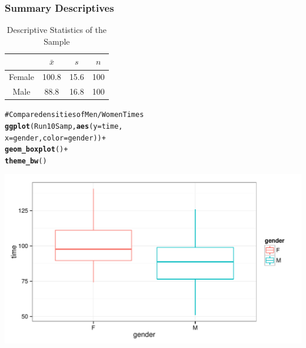 \documentclass{beamer}\usepackage{graphicx, color}
\makeatletter
\def\maxwidth{ %
  \ifdim\Gin@nat@width>\linewidth
    \linewidth
  \else
    \Gin@nat@width
  \fi
}
\newcommand{\hlfunctioncall}[1]{\textcolor[rgb]{0.501960784313725,0,0.329411764705882}{\textbf{#1}}}%
\newcommand{\hlcomment}[1]{\textcolor[rgb]{0.180392156862745,0.6,0.341176470588235}{#1}}%
\newenvironment{kframe}{%
 \def\at@end@of@kframe{}%
 \ifinner\ifhmode%
  \def\at@end@of@kframe{\end{minipage}}%
  \begin{minipage}{\columnwidth}%
 \fi\fi%
 \def\FrameCommand##1{\hskip\@totalleftmargin \hskip-\fboxsep
 \colorbox{shadecolor}{##1}\hskip-\fboxsep
     \hskip-\linewidth \hskip-\@totalleftmargin \hskip\columnwidth}%
 \MakeFramed {\advance\hsize-\width
   \@totalleftmargin\z@ \linewidth\hsize
   \@setminipage}}%
 {\par\unskip\endMakeFramed%
 \at@end@of@kframe}
\newenvironment{knitrout}{}{} %
\makeatother
\begin{document}
\begin{frame}[fragile]
  \frametitle{Summary Descriptives}


  
  \begin{table}
  \caption{Descriptive Statistics of the Sample}
  \begin{tabular}{c | c c c}
  & $\bar{x}$ & $s$ & $n$ \\
  \hline\hline
  Female & 100.8 & 15.6 & 100 \\
  Male & 88.8 & 16.8 & 100 \\
  \hline
  
  \end{tabular}
  \end{table}
\end{frame}

\begin{frame}
\begin{knitrout}
\color{fgcolor}\begin{kframe}
\begin{alltt}
\hlcomment{# Compare densities of Men/Women Times}
\hlfunctioncall{ggplot}(Run10Samp, \hlfunctioncall{aes}(y = time, 
                      x = gender, color = gender)) +
        \hlfunctioncall{geom_boxplot}() +
        \hlfunctioncall{theme_bw}()
\end{alltt}
\end{kframe}

{\centering \includegraphics[width=\maxwidth]{figure/GenderDist} 

}


\end{knitrout}

\end{frame}
\end{document}
